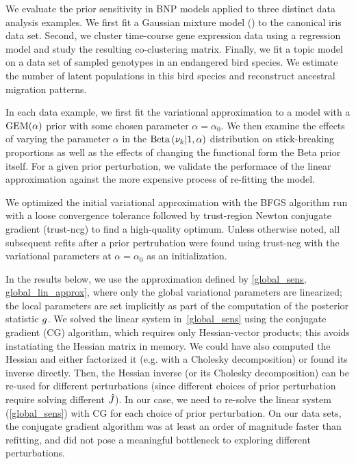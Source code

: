 We evaluate the prior sensitivity in BNP models applied to three distinct data analysis examples.
We first fit a Gaussian mixture model () to the canonical iris data set.
Second, we cluster time-course gene expression data using a regression model
and study the resulting co-clustering matrix.
Finally, we fit a topic model
on a data set of sampled genotypes in an endangered bird species.
We estimate the number of latent populations in this
bird species and reconstruct ancestral migration patterns.

In each data example, we first fit the variational approximation to a model
with a $\mathrm{GEM}(\alpha)$ prior with some chosen parameter $\alpha = \alpha_0$.
We then examine the effects of varying the parameter $\alpha$
in the $\mathrm{Beta}\left(\nu_{k} \vert 1, \alpha\right)$ distribution on stick-breaking proportions
as well as
the effects of changing the functional form the Beta prior itself.
For a given prior perturbation,
we validate the performace of the linear approximation against
the more expensive process of re-fitting the model.



We optimized the initial variational approximation with
the BFGS algorithm run with a loose convergence tolerance
followed by trust-region Newton conjugate gradient (trust-ncg) to find a high-quality optimum.
Unless otherwise noted, all subsequent refits after a prior pertrubation were found
using trust-ncg with the variational parameters at $\alpha = \alpha_0$ as an initialization.

In the results below, we use
the approximation defined by \eqref{global_sens, global_lin_approx},
where only the global variational parameters are linearized;
the local parameters are set implicitly as part of the
computation of the posterior statistic $g$.
We solved the linear system in~\eqref{global_sens} using
the conjugate gradient (CG) algorithm, which requires only Hessian-vector products;
this avoids instatiating the Hessian matrix in memory.
We could have also computed the Hessian and
either factorized it (e.g. with a Cholesky decomposition) or found its inverse directly.
Then, the Hessian inverse (or its Cholesky decomposition) can
be re-used for different perturbations
(since different choices of prior perturbation
require solving different $\hat J$).
In our case, we need to re-solve the linear system (\eqref{global_sens}) with
CG for each choice of prior perturbation.
On our data sets, the conjugate gradient algorithm was at least
an order of magnitude faster than refitting, and did not pose a meaningful bottleneck
to exploring different perturbations.

